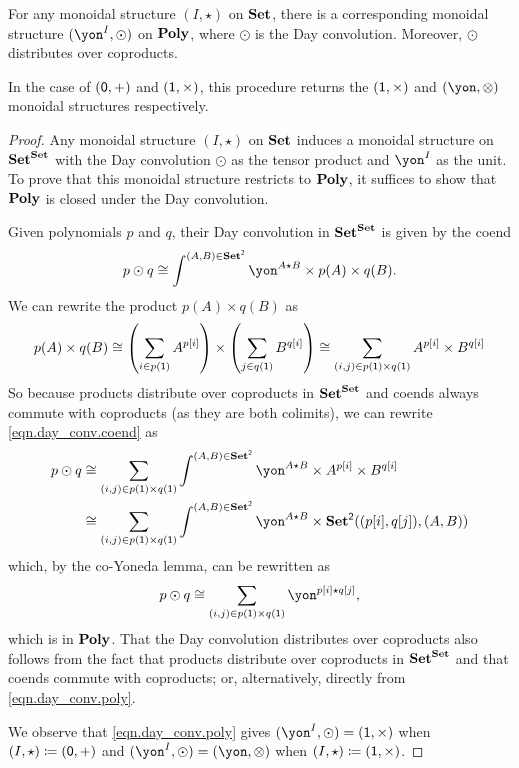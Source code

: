 \documentclass[Book-Poly]{subfiles}
\begin{document}
\begin{proposition} \label{prop.day}
For any monoidal structure $(I,\star)$ on $\mathbf{Set}$, there is a corresponding monoidal structure $(\yon^I, \odot)$ on $\mathbf{Poly}$, where $\odot$ is the Day convolution.
Moreover, $\odot$ distributes over coproducts.

In the case of $(\textsf{0},+)$ and $(\textsf{1},\times)$, this procedure returns the $(\textsf{1},\times)$ and $(\yon,\otimes)$ monoidal structures respectively.
\end{proposition}
\begin{proof}
Any monoidal structure $(I,\star)$ on $\mathbf{Set}$ induces a monoidal structure on $\mathbf{Set}^{\mathbf{Set}}$ with the Day convolution $\odot$ as the tensor product and $\yon^I$ as the unit.
To prove that this monoidal structure restricts to $\mathbf{Poly}$, it suffices to show that $\mathbf{Poly}$ is closed under the Day convolution.

Given polynomials $p$ and $q$, their Day convolution in $\mathbf{Set}^{\mathbf{Set}}$ is given by the coend
\begin{equation} \label{eqn.day_conv.coend}
    p \odot q \iso \int^{(A,B)\in\smset^\2} \yon^{A \star B} \times p(A) \times q(B).
\end{equation}
We can rewrite the product $p(A) \times q(B)$ as
\[
    p(A) \times q(B) \cong \left(\sum_{i \in p(\textsf{1})} A^{p[i]}\right) \times \left(\sum_{j \in q(\textsf{1})} B^{q[i]}\right) \cong \sum_{(i,j) \in p(\textsf{1}) \times q(\textsf{1})} A^{p[i]} \times B^{q[i]}
\]
So because products distribute over coproducts in $\mathbf{Set}^{\mathbf{Set}}$ and coends always commute with coproducts (as they are both colimits), we can rewrite \eqref{eqn.day_conv.coend} as
\begin{align*}
    p \odot q &\iso \sum_{(i,j) \in p(\1) \times q(\1)} \int^{(A,B)\in\smset^\2} \yon^{A \star B} \times A^{p[i]} \times B^{q[i]} \\
    &\iso \sum_{(i,j) \in p(\1) \times q(\1)} \int^{(A,B)\in\smset^\2} \yon^{A \star B} \times \smset^\2((p[i],q[j]),(A,B))
\end{align*}
which, by the co-Yoneda lemma, can be rewritten as
\begin{equation} \label{eqn.day_conv.poly}
    p \odot q \iso \sum_{(i,j) \in p(\1) \times q(\1)} \yon^{p[i] \star q[j]},
\end{equation}
which is in $\mathbf{Poly}$.
That the Day convolution distributes over coproducts also follows from the fact that products distribute over coproducts in $\mathbf{Set}^{\mathbf{Set}}$ and that coends commute with coproducts; or, alternatively, directly from \eqref{eqn.day_conv.poly}.

We observe that \eqref{eqn.day_conv.poly} gives $(\yon^I, \odot) = (\1, \times)$ when $(I, \star) \coloneqq (\textsf{0}, +)$ and $(\yon^I, \odot) = (\yon, \otimes)$ when $(I, \star) \coloneqq (\textsf{1}, \times)$.
\end{proof}
\end{document}
